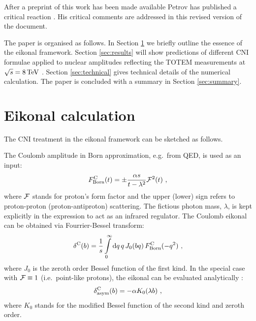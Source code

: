 \documentclass{appolb}
\def\d{{\rm d}}
\def\un#1{\,{\rm #1}}
\def\NEW#1{{#1}}
\begin{document}
\NEW{After a preprint of this work has been made available \cite{preprint} Petrov has published a critical reaction \cite{petrov2020-2}. His critical comments are addressed in this revised version of the document.}

The paper is organised as follows. In Section \ref{sec:eikonal} we briefly outline the essence of the eikonal framework. Section \ref{sec:results} will show predictions of different CNI formulae applied to nuclear amplitudes reflecting the TOTEM measurements at $\sqrt s = 8\un{TeV}$ \cite{totem-8tev-1km}. Section \ref{sec:technical} gives technical details of the numerical calculation. The paper is concluded with a summary in Section \ref{sec:summary}.




\section{Eikonal calculation}
\label{sec:eikonal}

The CNI treatment in the eikonal framework can be sketched as follows.

The Coulomb amplitude in Born approximation, e.g.~from QED, is used as an input:
\begin{equation}
F^{\rm C}_{\rm Born}(t) = \pm {\alpha s\over t - \lambda^2} {\cal F}^2(t)\ ,
\label{eq:F C Born}
\end{equation}
where ${\cal F}$ stands for proton's form factor and the upper (lower) sign refers to proton-proton (proton-antiproton) scattering. The fictious photon mass, $\lambda$, is kept explicitly in the expression to act as an infrared regulator. The Coulomb eikonal can be obtained via Fourrier-Bessel transform:
\begin{equation}
\delta^{\rm C}(b) = {1\over s} \int\limits_0^\infty \d q\, q\, J_0(bq)\, F^{\rm C}_{\rm Born}(-q^2)\ ,
\label{eq:de C}
\end{equation}
where $J_0$ is the zeroth order Bessel function of the first kind. In the special case with ${\cal F} \equiv 1$ (i.e.~point-like protons), the eikonal can be evaluated analytically \cite{cahn82}:
\begin{equation}
\delta^{\rm C}_{\rm asym}(b) = -\alpha K_0(\lambda b)\ ,
\label{eq:de C asym}
\end{equation}
where $K_0$ stands for the modified Bessel function of the second kind and zeroth order.
\end{document}

